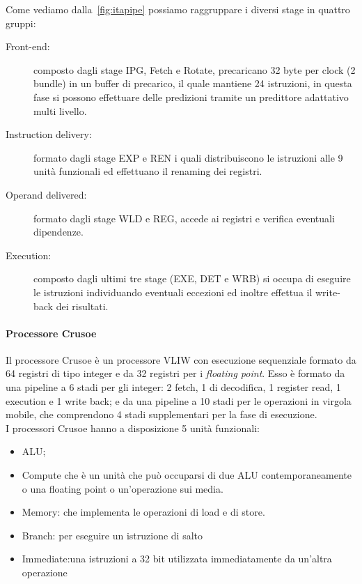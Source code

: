 Come vediamo dalla \figurename\,\ref{fig:itapipe} possiamo raggruppare i diversi stage in quattro gruppi:
\begin{description}
\item[Front-end:] composto dagli stage IPG, Fetch e Rotate, precaricano 32 byte per clock (2 bundle) in un buffer di precarico, il quale mantiene 24 istruzioni, in questa fase si possono effettuare delle predizioni tramite un predittore adattativo multi livello.
\item[Instruction delivery:] formato dagli stage EXP e REN i quali distribuiscono le istruzioni alle 9 unità funzionali ed effettuano il renaming dei registri.
\item[Operand delivered:] formato dagli stage WLD e REG, accede ai registri e verifica eventuali dipendenze.
\item[Execution:] composto dagli ultimi tre stage (EXE, DET e WRB) si occupa di eseguire le istruzioni individuando eventuali eccezioni ed inoltre effettua il write-back dei risultati.
\end{description}
\paragraph{Processore Crusoe}
Il processore Crusoe è un processore VLIW con esecuzione sequenziale formato da 64 registri di tipo integer e da 32 registri per i \emph{floating point}. Esso è formato da una pipeline a 6 stadi per gli integer: 2 fetch, 1 di decodifica, 1 register read, 1 execution e 1 write back; e da una pipeline a 10 stadi per le operazioni in virgola mobile, che comprendono 4 stadi supplementari per la fase di esecuzione.\\
I processori Crusoe hanno a disposizione 5 unità funzionali:
\begin{itemize}
\item ALU;
\item Compute che è un unità che può occuparsi di due ALU contemporaneamente o una floating point o un'operazione sui media.
\item Memory: che implementa le operazioni di load e di store.
\item Branch: per eseguire un istruzione di salto
\item Immediate:una istruzioni a 32 bit utilizzata immediatamente da un'altra operazione
\end{itemize}
